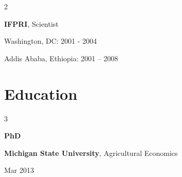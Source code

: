 \documentclass[10pt, letterpaper]{article}
\newenvironment{highlights}{
    \begin{itemize}[
        topsep=0.10 cm,
        parsep=0.10 cm,
        partopsep=0pt,
        itemsep=0pt,
        leftmargin=0.4 cm + 10pt
    ]
}{
    \end{itemize}
} %
\newenvironment{twocolentry}[2][]{
    \onecolentry
    \def\secondColumn{#2}
    \setcolumnwidth{\fill, 6.5 cm}
    \begin{paracol}{2}
}{
    \switchcolumn \raggedleft \secondColumn
    \end{paracol}
    \endonecolentry
} %
\newenvironment{threecolentry}[3][]{
    \onecolentry
    \def\thirdColumn{#3}
    \setcolumnwidth{1 cm, \fill, 4.5 cm}
    \begin{paracol}{3}
    {\raggedright #2} \switchcolumn
}{
    \switchcolumn \raggedleft \thirdColumn
    \end{paracol}
    \endonecolentry
} %
\let\hrefWithoutArrow\href
\renewcommand{\href}[2]{\hrefWithoutArrow{#1}{\ifthenelse{\equal{#2}{}}{ }{#2 }\raisebox{.15ex}{\footnotesize \faExternalLink*}}}
\begin{document}
        \begin{twocolentry}{
            Washington, DC: 2001 - 2004
            
            Addis Ababa, Ethiopia: 2001 – 2008
        }
            \textbf{IFPRI}, Scientist
        \end{twocolentry}

    \section{Education}



        
        \begin{threecolentry}{\textbf{PhD}}{
            Mar 2013
        }
            \textbf{Michigan State University}, Agricultural Economics
        \end{threecolentry}
        
    
\end{document}
